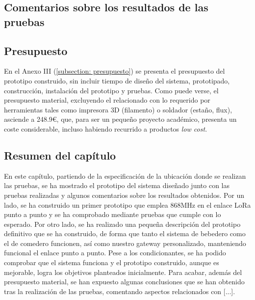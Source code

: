 \documentclass[12pt]{article}
\begin{document}
	\pagebreak
	
	\subsection[Comentarios sobre los resultados de las pruebas]{Comentarios sobre los resultados de las pruebas}
	
	\noindent 
	
	\pagebreak
	
	\subsection[Presupuesto]{Presupuesto}

	\noindent En el Anexo III (\ref{subsection: presupuesto}) se presenta el presupuesto del prototipo construido, sin incluir tiempo de diseño del sistema, prototipado, construcción, instalación del prototipo y pruebas. Como puede verse, el presupuesto material, excluyendo el relacionado con lo requerido por herramientas tales como impresora 3D (filamento) o soldador (estaño, flux), asciende a 248.9\euro, que, para ser un pequeño proyecto académico, presenta un coste considerable, incluso habiendo recurrido a productos \textit{low cost}. \\
	
	\pagebreak
	
	\subsection[Resumen del capítulo]{Resumen del capítulo}
	
	\noindent En este capítulo, partiendo de la especificación de la ubicación donde se realizan las pruebas, se ha mostrado el prototipo del sistema diseñado junto con las pruebas realizadas y algunos comentarios sobre los resultados obtenidos. Por un lado, se ha construido un primer prototipo que emplea 868MHz en el enlace LoRa punto a punto y se ha comprobado mediante pruebas que cumple con lo esperado. Por otro lado, se ha realizado una pequeña descripción del prototipo definitivo que se ha construido, de forma que tanto el sistema de bebedero como el de comedero funcionen, así como nuestro gateway personalizado, manteniendo funcional el enlace punto a punto. Pese a los condicionantes, se ha podido comprobar que el sistema funciona y el prototipo construido, aunque es mejorable, logra los objetivos planteados inicialmente. Para acabar, además del presupuesto material,  se han expuesto algunas conclusiones que se han obtenido tras la realización de las pruebas, comentando aspectos relacionados con  [...]. \\
	
\end{document}
